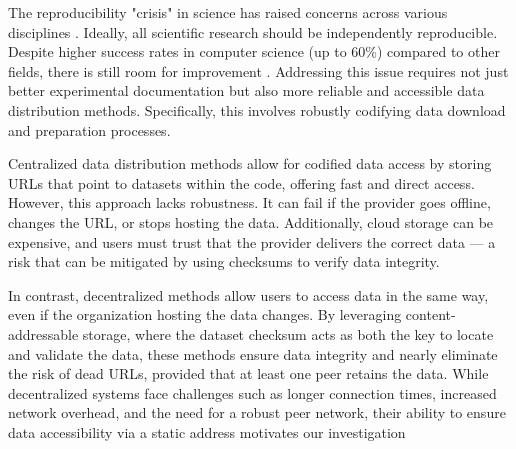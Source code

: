 \documentclass[10pt,twocolumn,letterpaper]{article}
\begin{document}



The reproducibility "crisis" in science has raised concerns across various disciplines
  \cite{baker_reproducibility_2016}.
Ideally, all scientific research should be independently reproducible.
Despite higher success rates in computer science (up to 60\%) compared to other fields, there is still room for improvement
\cite{NEURIPS2019_c429429b, collberg2016repeatability, desai_what_2024}.
Addressing this issue requires not just better experimental documentation but also more reliable and
  accessible data distribution methods.
Specifically, this involves robustly codifying data download and preparation processes.


Centralized data distribution methods allow for codified data access by storing URLs that point to datasets
  within the code, offering fast and direct access.
However, this approach lacks robustness.
It can fail if the provider goes offline, changes the URL, or stops hosting the data.
Additionally, cloud storage can be expensive, and users must trust that the provider delivers the correct
  data --- a risk that can be mitigated by using checksums to verify data integrity.

In contrast, decentralized methods allow users to access data in the same way, even if the organization
  hosting the data changes.
By leveraging content-addressable storage, where the dataset checksum acts as both the key to locate and
  validate the data, these methods ensure data integrity and nearly eliminate the risk of dead URLs, provided
  that at least one peer retains the data.
While decentralized systems face challenges such as longer connection times, increased network overhead, and
  the need for a robust peer network, their ability to ensure data accessibility via a static address
  motivates our investigation
\end{document}
